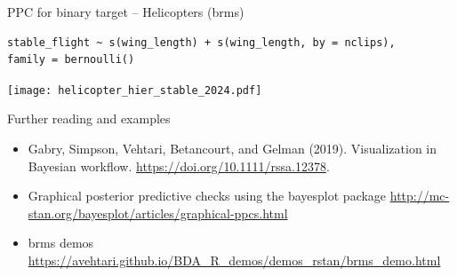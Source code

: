 \documentclass[t]{beamer}
\begin{document}
\begin{frame}[fragile]{PPC for binary target -- Helicopters (brms)}

  \vspace{-1.3\baselineskip}
{\scriptsize
\begin{verbatim}
stable_flight ~ s(wing_length) + s(wing_length, by = nclips),
family = bernoulli()
\end{verbatim}
}
  \vspace{-0.25\baselineskip}
  \texttt{[image: helicopter\_hier\_stable\_2024.pdf]}
  \vspace{-0.1\baselineskip}
  
\end{frame}

\begin{frame}{Further reading and examples}

  \begin{itemize}
  \item Gabry, Simpson, Vehtari, Betancourt, and Gelman
    (2019). Visualization in Bayesian
    workflow. \url{https://doi.org/10.1111/rssa.12378}.
  \item Graphical posterior predictive checks using the bayesplot package
    \url{http://mc-stan.org/bayesplot/articles/graphical-ppcs.html}
  \item brms demos \url{https://avehtari.github.io/BDA_R_demos/demos_rstan/brms_demo.html}

  \end{itemize}
  
\end{frame}
\end{document}
